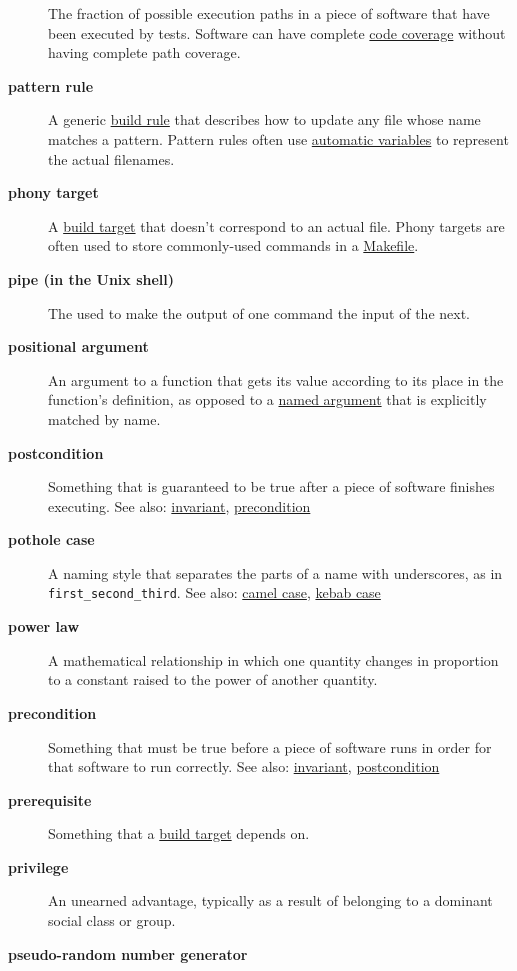 \documentclass[
]{krantz}
\begin{document}
\begin{description}
The fraction of possible execution paths in a piece of software that have been executed by tests. Software can have complete \protect\hyperlink{code_coverage}{code coverage} without having complete path coverage.
\item[\textbf{pattern rule}]
A generic \protect\hyperlink{build_rule}{build rule} that describes how to update any file whose name matches a pattern. Pattern rules often use \protect\hyperlink{automatic_variable}{automatic variables} to represent the actual filenames.
\item[\textbf{phony target}]
A \protect\hyperlink{build_target}{build target} that doesn't correspond to an actual file. Phony targets are often used to store commonly-used commands in a \protect\hyperlink{makefile}{Makefile}.
\item[\textbf{pipe (in the Unix shell)}]
The \texttt{\textbar{}} used to make the output of one command the input of the next.
\item[\textbf{positional argument}]
An argument to a function that gets its value according to its place in the function's definition, as opposed to a \protect\hyperlink{named_argument}{named argument} that is explicitly matched by name.
\item[\textbf{postcondition}]
Something that is guaranteed to be true after a piece of software finishes executing. See also: \protect\hyperlink{invariant}{invariant}, \protect\hyperlink{precondition}{precondition}
\item[\textbf{pothole case}]
A naming style that separates the parts of a name with underscores, as in \texttt{first\_second\_third}. See also: \protect\hyperlink{camel_case}{camel case}, \protect\hyperlink{kebab_case}{kebab case}
\item[\textbf{power law}]
A mathematical relationship in which one quantity changes in proportion to a constant raised to the power of another quantity.
\item[\textbf{precondition}]
Something that must be true before a piece of software runs in order for that software to run correctly. See also: \protect\hyperlink{invariant}{invariant}, \protect\hyperlink{postcondition}{postcondition}
\item[\textbf{prerequisite}]
Something that a \protect\hyperlink{build_target}{build target} depends on.
\item[\textbf{privilege}]
An unearned advantage, typically as a result of belonging to a dominant social class or group.
\item[\textbf{pseudo-random number generator}]

\end{description}
\end{document}
